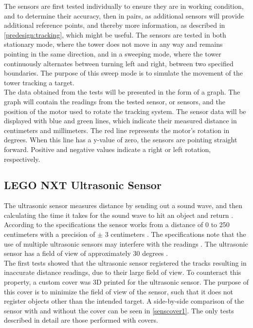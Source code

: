 The sensors are first tested individually to ensure they are in working condition, and to determine their accuracy, then in pairs, as additional sensors will provide additional reference points, and thereby more information, as described in \cref{predesign:tracking}, which might be useful. The sensors are tested in both stationary mode, where the tower does not move in any way and remains pointing in the same direction, and in a sweeping mode, where the tower continuously alternates between turning left and right, between two specified boundaries. The purpose of this sweep mode is to simulate the movement of the tower tracking a target. \\

The data obtained from the tests will be presented in the form of a graph. The graph will contain the readings from the tested sensor, or sensors, and the position of the motor used to rotate the tracking system. The sensor data will be displayed with blue and green lines, which indicate their measured distance in centimeters and millimeters. The red line represents the motor's rotation in degrees. When this line has a y-value of zero, the sensors are pointing straight forward. Positive and negative values indicate a right or left rotation, respectively.

\subsection{LEGO NXT Ultrasonic Sensor}\label{ss:ultrasonic}
The ultrasonic sensor measures distance by sending out a sound wave, and then calculating the time it takes for the sound wave to hit an object and return \cite[p. 29]{legonxtdata}. According to the specifications the sensor works from a distance of 0 to 250 centimeters with a precision of $\pm$ 3 centimeters \cite[p. 29]{legonxtdata}. The specifications note that the use of multiple ultrasonic sensors may interfere with the readings \cite[p. 29]{legonxtdata}. The ultrasonic sensor has a field of view of approximately 30 degrees \cite{ultraangle}. \\

The first tests showed that the ultrasonic sensor registered the tracks resulting in inaccurate distance readings, due to their large field of view. To counteract this property, a custom cover was 3D printed for the ultrasonic sensor. The purpose of this cover is to minimize the field of view of the sensor, such that it does not register objects other than the intended target. A side-by-side comparison of the sensor with and without the cover can be seen in \cref{senscover1}. The only tests described in detail are those performed with covers.

